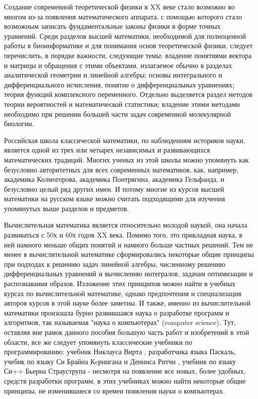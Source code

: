Создание современной теоретической физики в XX веке стало возможно во многом из-за появления математического аппарата, с помощью которого стало возможным записать фундаментальные законы физики в форме точных уравнений. Среди разделов высшей математики, необходимой для полноценной работы в биоинформатике и для понимания основ теоретической физики, следует перечислить, в порядке важности, следующие темы: владение понятиями вектора и матрицы и обращения с этими объектами, излагаемое обычно в разделах аналитической геометрии и линейной алгебры; основы интегрального и дифференциального исчисления, понятие о дифференциальных уравнениях; теория функций комплексного переменного. Отдельно выделяется раздел методов теории вероятностей и математической статистики; владение этими методами необходимо при решении большей части задач современной молекулярной биологии. 

Российская школа классической математики, по наблюдениям историков науки, является одной из трех или четырех независимых и развивающихся математических традиций. Многих ученых из этой школы можно упомянуть как безусловно авторитетных для всех современных математиков, как, например, академика Колмогорова, академика Понтрягина, академика Гельфанда, и безусловно целый ряд других имен. И потому многие из курсов высшей математики на русском языке можно считать подходящими для изучения упомянутых выше разделов и предметов.

Вычислительная математика является относительно молодой наукой, она начала развиваться с 50х и 60х годов XX века. Помимо того, это прикладная наука, в ней намного меньше общих понятий и намного больше частных решений. Тем не менее в вычислительной математике сформировались некоторые общие принципы при подходах к решению задач линейной алгебры, численному решению дифференциальных уравнений и вычислению интегралов, задачам оптимизации и распознавания образов. Изложение этих принципов можно найти в учебных курсах по вычислительной математике, однако предпочтения и специализация авторов курсов в этой науке более заметны. И также, именно из вычислительной математики произошла бурно развившаяся наука о разработке программ и алгоритмов, так называемая "наука о компьютерах" (computer science). Тут, оставляя вне рамок данного пособия большую часть работ и изобретений в этой области, все же следует упомянуть классические учебники по программированию: учебник Никлауса Вирта \parencite{Wirth_eng,Вирт_1982}, разработчика языка Паскаль, учебик по языку Си Брайна Кeрнигана и Денниса Ритчи \parencite{Керниган_1992,Kernighan_1978}, учебник по языку Си++ Бьерна Страуструпа \parencite{Stroustrup_1985} - несмотря на появление все новых, более удобных, средств разработки программ, в этих учебниках можно найти некоторые общие принципы, не изменившиеся со времен появления науки о компьютерах.

